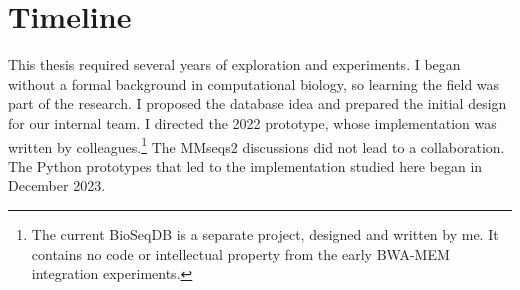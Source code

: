     \clearpage
    \section*{Timeline}
    \label{sec:introduction-timeline}

    This thesis required several years of exploration and experiments.
    I began without a formal background in computational biology, so
    learning the field was part of the research. I proposed the database
    idea and prepared the initial design for our internal team. I directed
    the 2022 prototype, whose implementation was written by colleagues.\footnote{\fontsize{7.5}{9}\selectfont The current BioSeqDB is a separate project, designed and written by me. It contains no code or intellectual property from the early BWA-MEM integration experiments.}
    The MMseqs2 discussions did not lead to a collaboration. The Python
    prototypes that led to the implementation studied here began in
    December 2023.

